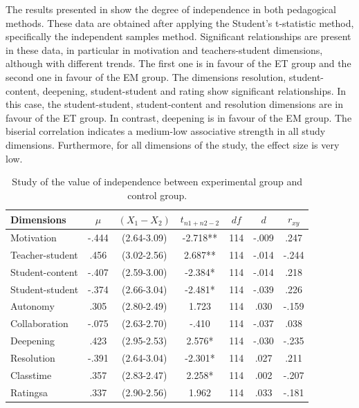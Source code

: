 \documentclass[english]{textolivre}
\begin{document}
The results presented in  show the degree of independence in both pedagogical methods. These data are obtained after applying the Student's t-statistic method, specifically the independent samples method. Significant relationships are present in these data, in particular in motivation and teachers-student dimensions, although with different trends. The first one is in favour of the ET group and the second one in favour of the EM group. The dimensions resolution, student-content, deepening, student-student and rating show significant relationships. In this case, the student-student, student-content and resolution dimensions are in favour of the ET group. In contrast, deepening is in favour of the EM group. The biserial correlation indicates a medium-low associative strength in all study dimensions. Furthermore, for all dimensions of the study, the effect size is very low.

\begin{table}[htpb]
\caption{Study of the value of independence between experimental group and control group.}
\label{tab3}
\centering
\begin{tabular}{lS[table-format=1.3]SSS[table-format=3]SS}%
\toprule
Dimensions & {$\mu$} & {$(X_1 - X_2)$} & {$t_{n1+n2-2}$} & {$df$} & {$d$} & {$r_{xy}$} \\
\midrule
Motivation & -.444 & {(2.64-3.09)} & -2.718** & 114 & -.009 & .247
\\
Teacher-student & .456 & {(3.02-2.56)} & 2.687** & 114 & -.014 & -.244
\\
Student-content & -.407 & {(2.59-3.00)} & -2.384* & 114 & -.014 & .218
\\
Student-student & -.374 & {(2.66-3.04)} & -2.481* & 114 & -.039 & .226
\\
Autonomy & .305 & {(2.80-2.49)} & 1.723 & 114 & .030 & -.159
\\
Collaboration & -.075 & {(2.63-2.70)} & -.410 & 114 & -.037 & .038
\\
Deepening & .423 & {(2.95-2.53)}	& 2.576* & 114 & -.030 & -.235
\\
Resolution & -.391 & {(2.64-3.04)} & -2.301*	& 114 & .027 & .211
\\
Classtime & .357 & {(2.83-2.47)} & 2.258* & 114 & .002 & -.207
\\
Ratingsa & .337 & {(2.90-2.56)} & 1.962	& 114 & .033 & -.181
\\
\bottomrule
\end{tabular}
\centering
{}
\end{table}
\end{document}
